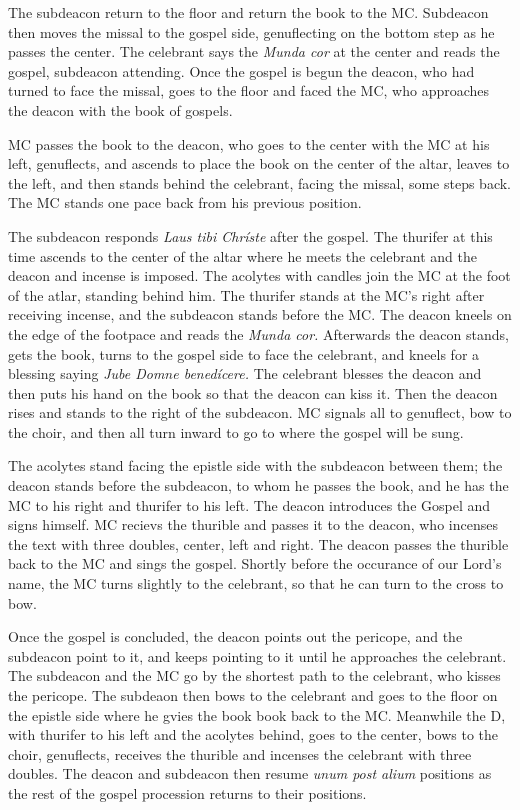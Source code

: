 \documentclass[letterpaper, twocolumn]{article}
\begin{document}
	\rubric The subdeacon return to the floor and return the book to the MC.
	Subdeacon then moves the missal to the gospel side, genuflecting on the
	bottom step as he passes the center. The celebrant says the \textit{Munda
	cor} at the center and reads the gospel, subdeacon attending. Once the
	gospel is begun the deacon, who had turned to face the missal, goes to the
	floor and faced the MC, who approaches the deacon with the book of gospels.

	\rubric MC passes the book to the deacon, who goes to the center with the
	MC at his left, genuflects, and ascends to place the book on the center of
	the altar, leaves to the left, and then stands behind the celebrant, facing
	the missal, some steps back. The MC stands one pace back from his previous
	position.

	\rubric The subdeacon responds \textit{Laus tibi Chríste} after the gospel.
	The thurifer at this time ascends to the center of the altar where he meets
	the celebrant and the deacon and incense is imposed. The acolytes with
	candles join the MC at the foot of the atlar, standing behind him. The
	thurifer stands at the MC's right after receiving incense, and the
	subdeacon stands before the MC. The deacon kneels on the edge of the
	footpace and reads the \textit{Munda cor.} Afterwards the deacon stands,
	gets the book, turns to the gospel side to face the celebrant, and kneels
	for a blessing saying \textit{Jube Domne benedícere.} The celebrant blesses
	the deacon and then puts his hand on the book so that the deacon can kiss
	it. Then the deacon rises and stands to the right of the subdeacon. MC
	signals all to genuflect, bow to the choir, and then all turn inward to go
	to where the gospel will be sung.

	\rubric The acolytes stand facing the epistle side with the subdeacon
	between them; the deacon stands before the subdeacon, to whom he passes the
	book, and he has the MC to his right and thurifer to his left. The deacon
	introduces the Gospel and signs himself. MC recievs the thurible and passes
	it to the deacon, who incenses the text with three doubles, center, left
	and right. The deacon passes the thurible back to the MC and sings the
	gospel. Shortly before the occurance of our Lord's name, the MC turns
	slightly to the celebrant, so that he can turn to the cross to bow.

	\rubric Once the gospel is concluded, the deacon points out the pericope,
	and the subdeacon point to it, and keeps pointing to it until he approaches
	the celebrant. The subdeacon and the MC go by the shortest path to the
	celebrant, who kisses the pericope. The subdeaon then bows to the celebrant
	and goes to the floor on the epistle side where he gvies the book book back
	to the MC. Meanwhile the D, with thurifer to his left and the acolytes
	behind, goes to the center, bows to the choir, genuflects, receives the
	thurible and incenses the celebrant with three doubles. The deacon and
	subdeacon then resume \textit{unum post alium} positions as the rest of the
	gospel procession returns to their positions.
\end{document}
